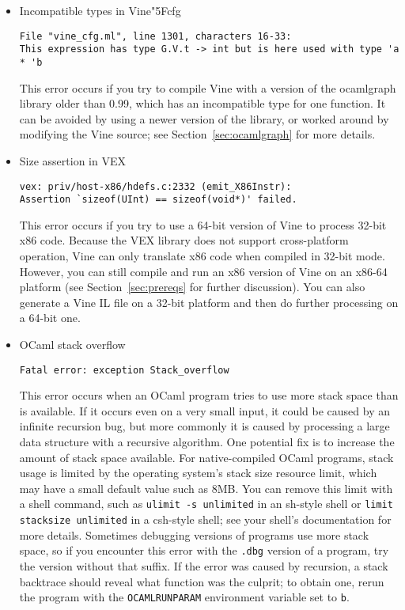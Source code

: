 \documentclass[11pt,onecolumn]{article}
\def\_{\char"5F}
\begin{document}
\begin{itemize}
\item Incompatible types in Vine\_cfg

\begin{Verbatim}[frame=lines, framesep=.5em]
File "vine_cfg.ml", line 1301, characters 16-33:
This expression has type G.V.t -> int but is here used with type 'a * 'b
\end{Verbatim}

This error occurs if you try to compile Vine with a version of the
ocamlgraph library older than 0.99, which has an incompatible type for
one function.
It can be avoided by using a newer version of the library, or worked
around by modifying the Vine source; see Section~\ref{sec:ocamlgraph}
for more details.

\item Size assertion in VEX

\begin{Verbatim}[frame=lines, framesep=.5em]
vex: priv/host-x86/hdefs.c:2332 (emit_X86Instr):
Assertion `sizeof(UInt) == sizeof(void*)' failed.
\end{Verbatim}

This error occurs if you try to use a 64-bit version of Vine to
process 32-bit x86 code.
Because the VEX library does not support cross-platform operation,
Vine can only translate x86 code when compiled in 32-bit mode.
However, you can still compile and run an x86 version of Vine on an
x86-64 platform (see Section~\ref{sec:prereqs} for further
discussion).
You can also generate a Vine IL file on a 32-bit platform and then do
further processing on a 64-bit one.

\item OCaml stack overflow

\begin{Verbatim}[frame=lines, framesep=.5em]
Fatal error: exception Stack_overflow
\end{Verbatim}

This error occurs when an OCaml program tries to use more stack space
than is available.
If it occurs even on a very small input, it could be caused by an
infinite recursion bug, but more commonly it is caused by processing a
large data structure with a recursive algorithm.
One potential fix is to increase the amount of stack space available.
For native-compiled OCaml programs, stack usage is limited by the
operating system's stack size resource limit, which may have a small
default value such as 8MB.
You can remove this limit with a shell command, such as {\tt ulimit -s
  unlimited} in an sh-style shell or {\tt limit stacksize unlimited}
in a csh-style shell; see your shell's documentation for more details.
Sometimes debugging versions of programs use more stack space, so if
you encounter this error with the {\tt .dbg} version of a program, try
the version without that suffix.
If the error was caused by recursion, a stack backtrace should reveal
what function was the culprit; to obtain one, rerun the program with
the {\tt OCAMLRUNPARAM} environment variable set to {\tt b}.
\end{itemize}
\end{document}
